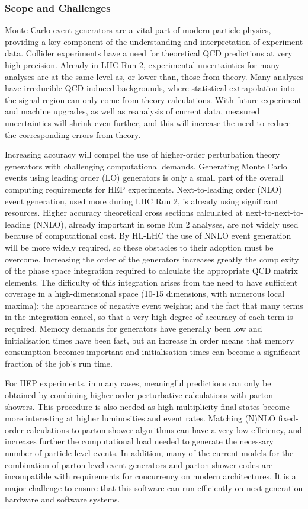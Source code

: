 \subsubsection*{Scope and Challenges}

Monte-Carlo event generators are a vital part of modern particle
physics, providing a key component of the understanding and
interpretation of experiment data. Collider experiments have a need for
theoretical QCD predictions at very high precision. Already in LHC Run
2, experimental uncertainties for many analyses are at the same level as,
or lower than, those from theory. Many analyses have irreducible
QCD-induced backgrounds, where statistical extrapolation into the signal
region can only come from theory calculations. With future experiment
and machine upgrades, as well as reanalysis of current data, measured
uncertainties will shrink even further, and this will increase the need
to reduce the corresponding errors from theory.

Increasing accuracy will compel the use of higher-order perturbation
theory generators with challenging computational demands. Generating
Monte Carlo events using leading order (LO) generators is only a small
part of the overall computing requirements for HEP experiments.
Next-to-leading order (NLO) event generation, used more during LHC Run
2, is already using significant resources. Higher accuracy
theoretical cross sections calculated at next-to-next-to-leading (NNLO),
already important in some Run 2 analyses, are not widely used
because of computational cost. By HL-LHC the use of NNLO event
generation will be more widely required, so these obstacles to their
adoption must be overcome.
Increasing the order of the generators increases greatly the complexity
of the phase space integration required to calculate the appropriate QCD
matrix elements. The difficulty of this integration arises from the need
to have sufficient coverage in a high-dimensional space (10-15
dimensions, with numerous local maxima); the appearance of negative event
weights; and the fact that many terms in the integration cancel, so that
a very high degree of accuracy of each term is required. Memory demands
for generators have generally been low and initialisation times have
been fast, but an increase in order means that memory consumption
becomes important and initialisation times can become a significant
fraction of the job's run time.

For HEP experiments, in many cases, meaningful predictions can only be
obtained by combining higher-order perturbative calculations with parton
showers. This procedure is also needed as high-multiplicity final states
become more interesting at higher luminosities and event rates. Matching
(N)NLO fixed-order calculations to parton shower algorithms can have a
very low efficiency, and increases further the computational load needed
to generate the necessary number of particle-level events. In addition,
many of the current models for the combination of parton-level event
generators and parton shower codes are incompatible with requirements
for concurrency on modern architectures. It is a major challenge to
ensure that this software can run efficiently on next generation
hardware and software systems.

